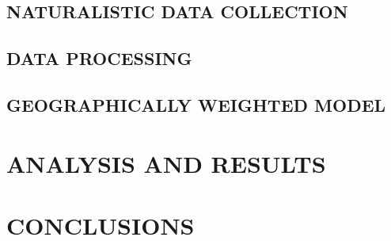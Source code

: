 \section{NATURALISTIC DATA COLLECTION} \label{ndsc}



\section{DATA PROCESSING} \label{data}






\section{GEOGRAPHICALLY WEIGHTED MODEL} \label{gwm}




\chapter{ANALYSIS AND RESULTS}









\chapter{CONCLUSIONS}
